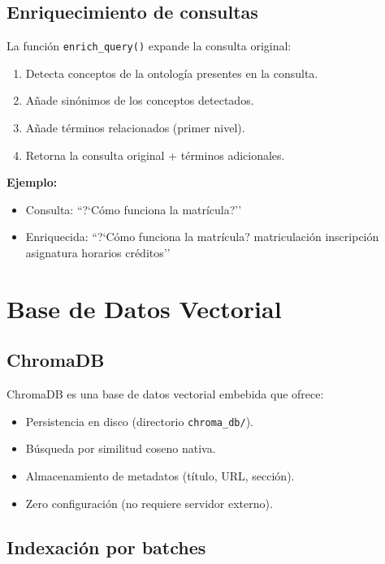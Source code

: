 \documentclass[12pt, a4paper, twoside]{report}
\begin{document}
\subsection{Enriquecimiento de consultas}

La funci\'on \texttt{enrich\_query()} expande la consulta original:

\begin{enumerate}
  \item Detecta conceptos de la ontolog\'ia presentes en la consulta.
  \item A\~nade sin\'onimos de los conceptos detectados.
  \item A\~nade t\'erminos relacionados (primer nivel).
  \item Retorna la consulta original + t\'erminos adicionales.
\end{enumerate}

\textbf{Ejemplo:}
\begin{itemize}
  \item Consulta: ``?`C\'omo funciona la matr\'icula?''
  \item Enriquecida: ``?`C\'omo funciona la matr\'icula? matriculaci\'on inscripci\'on asignatura horarios cr\'editos''
\end{itemize}

\section{Base de Datos Vectorial}

\subsection{ChromaDB}

ChromaDB es una base de datos vectorial embebida que ofrece:

\begin{itemize}
  \item Persistencia en disco (directorio \texttt{chroma\_db/}).
  \item B\'usqueda por similitud coseno nativa.
  \item Almacenamiento de metadatos (t\'itulo, URL, secci\'on).
  \item Zero configuraci\'on (no requiere servidor externo).
\end{itemize}

\subsection{Indexaci\'on por batches}
\end{document}
